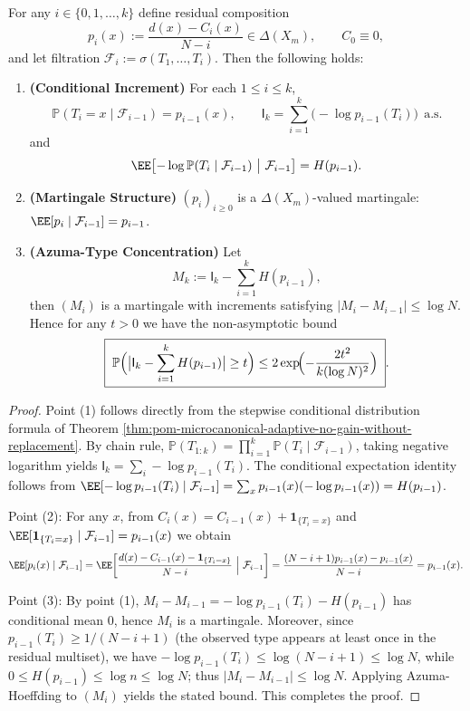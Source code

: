 \begin{theorem}\label{thm:pom-microcanonical-information-doob}
For any \(i\in\{0,1,\dots,k\}\) define residual composition
\[
p_i(x):=\frac{d(x)-C_i(x)}{N-i}\in\Delta(X_m),
\qquad C_0\equiv 0,
\]
and let filtration \(\mathcal F_i:=\sigma(T_1,\dots,T_i)\).
Then the following holds:
\begin{enumerate}
  \item \textbf{(Conditional Increment)} For each \(1\le i\le k\),
  \[
  \mathbb{P}(T_i=x\mid \mathcal F_{i-1})=p_{i-1}(x),
  \qquad
  \mathsf{I}_k=\sum_{i=1}^k\bigl(-\log p_{i-1}(T_i)\bigr)\ \ \text{a.s.}
  \]
  and
  \[
  \EE\!\left[-\log\mathbb{P}(T_i\mid\mathcal F_{i-1})\ \big|\ \mathcal F_{i-1}\right]=H(p_{i-1}).
  \]
  \item \textbf{(Martingale Structure)} \((p_i)_{i\ge 0}\) is a \(\Delta(X_m)\)-valued martingale: \(\EE[p_i\mid\mathcal F_{i-1}]=p_{i-1}\).
  \item \textbf{(Azuma-Type Concentration)} Let
  \[
  M_k:=\mathsf{I}_k-\sum_{i=1}^k H(p_{i-1}),
  \]
  then \((M_i)\) is a martingale with increments satisfying \(|M_i-M_{i-1}|\le \log N\).
  Hence for any \(t>0\) we have the non-asymptotic bound
  \[
  \boxed{\;
  \mathbb{P}\Bigl(\bigl|\mathsf{I}_k-\sum_{i=1}^k H(p_{i-1})\bigr|\ge t\Bigr)
  \le 2\exp\!\Bigl(-\frac{2t^2}{k(\log N)^2}\Bigr)\; } .
  \]
\end{enumerate}
\end{theorem}
\begin{proof}
Point (1) follows directly from the stepwise conditional distribution formula of Theorem \ref{thm:pom-microcanonical-adaptive-no-gain-without-replacement}.
By chain rule,
\(
\mathbb{P}(T_{1:k})=\prod_{i=1}^k\mathbb{P}(T_i\mid\mathcal F_{i-1})
\), taking negative logarithm yields \(\mathsf{I}_k=\sum_i -\log p_{i-1}(T_i)\).
The conditional expectation identity follows from
\(
\EE[-\log p_{i-1}(T_i)\mid\mathcal F_{i-1}]
=\sum_x p_{i-1}(x)(-\log p_{i-1}(x))
=H(p_{i-1})
\).
\par
Point (2): For any \(x\), from \(C_i(x)=C_{i-1}(x)+\mathbf{1}_{\{T_i=x\}}\) and
\(\EE[\mathbf{1}_{\{T_i=x\}}\mid\mathcal F_{i-1}]=p_{i-1}(x)\) we obtain
\[
\EE[p_i(x)\mid\mathcal F_{i-1}]
=\EE\!\left[\frac{d(x)-C_{i-1}(x)-\mathbf{1}_{\{T_i=x\}}}{N-i}\ \Big|\ \mathcal F_{i-1}\right]
=\frac{(N-i+1)p_{i-1}(x)-p_{i-1}(x)}{N-i}
=p_{i-1}(x).
\]
\par
Point (3): By point (1), \(M_i-M_{i-1}=-\log p_{i-1}(T_i)-H(p_{i-1})\) has conditional mean \(0\), hence \(M_i\) is a martingale.
Moreover, since \(p_{i-1}(T_i)\ge 1/(N-i+1)\) (the observed type appears at least once in the residual multiset),
we have \(-\log p_{i-1}(T_i)\le \log(N-i+1)\le \log N\), while \(0\le H(p_{i-1})\le \log n\le \log N\);
thus \(|M_i-M_{i-1}|\le \log N\).
Applying Azuma-Hoeffding to \((M_i)\) yields the stated bound. This completes the proof.
\end{proof}

